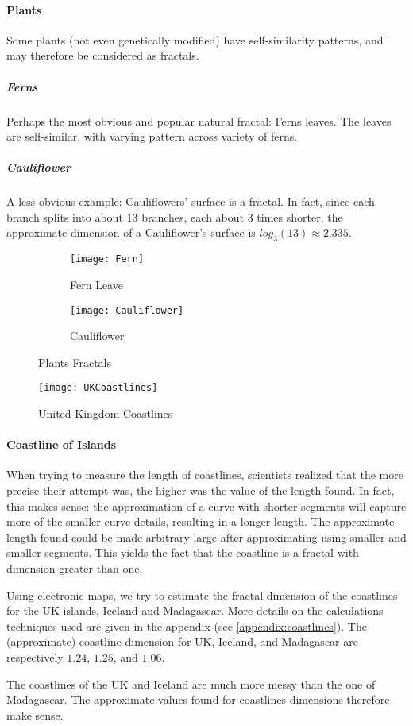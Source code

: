 \paragraph{Plants}
Some plants (not even genetically modified) have self-similarity patterns, and may therefore be considered as fractals.


\subparagraph{Ferns}
Perhaps the most obvious and popular natural fractal: Ferns leaves.
The leaves are self-similar, with varying pattern across variety of ferns.

\subparagraph{Cauliflower}
A less obvious example: Cauliflowers' surface is a fractal.
In fact, since each branch splits into about 13 branches, each about 3 times shorter, the approximate dimension of a Cauliflower's surface is $log_3(13) \approx 2.335$.

\begin{figure}[!h]
	\centering
	\begin{subfigure}{.49\textwidth}
		\texttt{[image: Fern]}
		\centering
		\captionsetup{justification=centering}
		\caption{Fern Leave}
		\label{fig:fern}
	\end{subfigure}
	\begin{subfigure}{.49\textwidth}
		\texttt{[image: Cauliflower]}
		\centering
		\captionsetup{justification=centering}
		\caption{Cauliflower}
		\label{fig:cauliflower}
	\end{subfigure}
	\caption{Plants Fractals}
	\label{fig:plantsFractals}
\end{figure}


\begin{wrapfigure}{r}{5.75cm}
	\texttt{[image: UKCoastlines]}
	\centering
	\caption{United Kingdom Coastlines}
	\label{fig:UKCoastlines}
\end{wrapfigure}
\paragraph{Coastline of Islands}
When trying to measure the length of coastlines, scientists realized that the more precise their attempt was, the higher was the value of the length found.
In fact, this makes sense: the approximation of a curve with shorter segments will capture more of the smaller curve details, resulting in a longer length.
The approximate length found could be made arbitrary large after approximating using smaller and smaller segments.
This yields the fact that the coastline is a fractal with dimension greater than one.

Using electronic maps, we try to estimate the fractal dimension of the coastlines for the UK islands, Iceland and Madagascar.
More details on the calculations techniques used are given in the appendix (see \ref{appendix:coastlines}).
The (approximate) coastline dimension for UK, Iceland, and Madagascar are respectively $1.24$, $1.25$, and $1.06$.

The coastlines of the UK and Iceland are much more messy than the one of Madagascar.
The approximate values found for coastlines dimensions therefore make sense.
